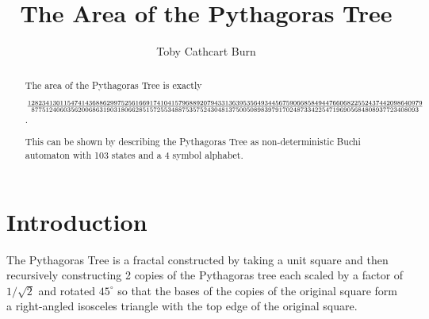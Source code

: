 \documentclass{article}
\author{Toby {Cathcart Burn}}
\title{The Area of the Pythagoras Tree}
\newcommand{\tree}[1]{
	\fill[fill=black] (0,0) -- (1,0) -- (1,1) -- (0,1) -- cycle;
	\ifthenelse{#1<2}{}{
		\begin{scope}[yshift=1cm,rotate=45,scale=0.7071]
			\tree{\the\numexpr#1-1}
		\end{scope}
		\begin{scope}[xshift=0.5cm,yshift=1.5cm,rotate=-45,scale=0.7071]
			\tree{\the\numexpr#1-1} 
		\end{scope}
}}
\begin{document}
\maketitle
\begin{abstract}
The area of the Pythagoras Tree is exactly
	
${12823413011547414368862997525616691741041579688920794331363953564934456759066858494476606822552437442098640979}\over{877512406035620068631903180662851572553488753575243048137500508983979170248733422547196905684808937723408093}$.
	
This can be shown by describing the Pythagoras Tree as non-deterministic Buchi automaton with 103 states %
and a 4 symbol alphabet.
\end{abstract}
\section{Introduction}
The Pythagoras Tree is a fractal constructed by taking a unit square and then recursively constructing 2 copies of the Pythagoras tree each scaled by a factor of $1/\sqrt{2}$ and rotated $45^\circ$ so that the bases of the copies of the original square form a right-angled isosceles triangle with the top edge of the original square.


\end{document}
